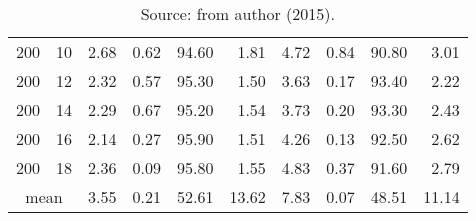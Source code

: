 \begin{table*}[h]
\begin{center}
\begin{tabular} {l l | r r r r | r r r r }
200  &             10  &  2.68   &            0.62             &               94.60  &  1.81   &  4.72   &            0.84             &               90.80  &  3.01   \\
200  &             12  &  2.32   &            0.57             &               95.30  &  1.50   &  3.63   &            0.17             &               93.40  &  2.22   \\
200  &             14  &  2.29   &            0.67             &               95.20  &  1.54   &  3.73   &            0.20             &               93.30  &  2.43   \\
200  &             16  &  2.14   &            0.27             &               95.90  &  1.51   &  4.26   &            0.13             &               92.50  &  2.62   \\
200  &             18  &  2.36   &            0.09             &               95.80  &  1.55   &  4.83   &            0.37             &               91.60  &  2.79   \\
\hline
\multicolumn{2}{c|}{mean} &  3.55   &            0.21             &               52.61  &  13.62  &  7.83   &            0.07             &               48.51  &  11.14  \\
\hline
\end{tabular}\caption*{Source: from author (2015).} 
\end{center}
\end{table*}



